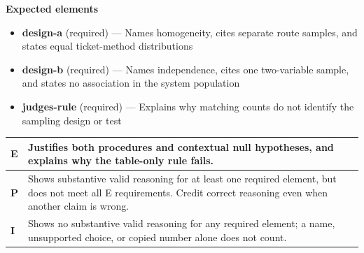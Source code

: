 \documentclass[11pt]{article}
\begin{document}

\textbf{Expected elements}
\begin{itemize}[leftmargin=1.5em,itemsep=2pt,topsep=2pt]
  \item \textbf{design-a} (required) --- Names homogeneity, cites separate route samples, and states equal ticket-method distributions
  \item \textbf{design-b} (required) --- Names independence, cites one two-variable sample, and states no association in the system population
  \item \textbf{judges-rule} (required) --- Explains why matching counts do not identify the sampling design or test
\end{itemize}

{\small\renewcommand{\arraystretch}{1.25}
\noindent\begin{tabular}{|p{0.5in}|p{5.9in}|}
\hline
\textbf{E} & Justifies both procedures and contextual null hypotheses, and explains why the table-only rule fails. \\ \hline
\textbf{P} & Shows substantive valid reasoning for at least one required element, but does not meet all E requirements. Credit correct reasoning even when another claim is wrong. \\ \hline
\textbf{I} & Shows no substantive valid reasoning for any required element; a name, unsupported choice, or copied number alone does not count. \\ \hline
\end{tabular}}

\clearpage
{}
\end{document}
